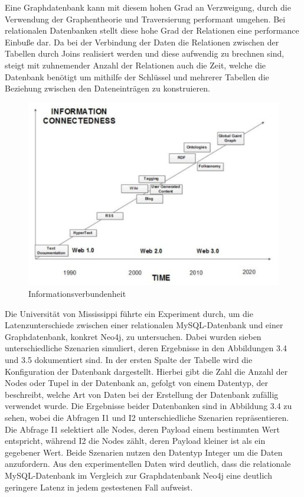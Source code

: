 \noindent
Eine Graphdatenbank kann mit diesem hohen Grad an Verzweigung, durch die Verwendung der Graphentheorie und Traversierung performant umgehen.  Bei relationalen Datenbanken stellt diese hohe Grad der Relationen eine performance Einbuße dar.  Da bei der Verbindung der Daten die Relationen zwischen der Tabellen durch Joins realisiert werden und diese aufwendig zu brechnen sind, steigt mit zuhnemender Anzahl der Relationen auch die Zeit, welche die Datenbank benötigt um mithilfe der Schlüssel und mehrerer Tabellen die Beziehung zwischen den Dateneinträgen zu konstruieren. \citep{9677042} \citep{graphdb}
\begin{figure}[H]
	\centering
	\includegraphics[scale=.45]{Illustrations/informationconnectedness.png}
	\caption{Informationsverbundenheit \citep{performancenosql}}
\end{figure}
\noindent
Die Universität von Mississippi führte ein Experiment durch, um die Latenzunterschiede zwischen einer relationalen MySQL-Datenbank und einer Graphdatenbank, konkret Neo4j, zu untersuchen. Dabei wurden sieben unterschiedliche Szenarien simuliert, deren Ergebnisse in den Abbildungen 3.4 und 3.5 dokumentiert sind. In der ersten Spalte der Tabelle wird die Konfiguration der Datenbank dargestellt. Hierbei gibt die Zahl die Anzahl der Nodes oder Tupel in der Datenbank an, gefolgt von einem Datentyp, der beschreibt, welche Art von Daten bei der Erstellung der Datenbank zufällig verwendet wurde.
Die Ergebnisse beider Datenbanken sind in Abbildung 3.4 zu sehen, wobei die Abfragen I1 und I2 unterschiedliche Szenarien repräsentieren. Die Abfrage I1 selektiert alle Nodes, deren Payload einem bestimmten Wert entspricht, während I2 die Nodes zählt, deren Payload kleiner ist als ein gegebener Wert. Beide Szenarien nutzen den Datentyp Integer um die Daten anzufordern. Aus den experimentellen Daten wird deutlich, dass die relationale MySQL-Datenbank im Vergleich zur Graphdatenbank Neo4j eine deutlich geringere Latenz in jedem gestestenen Fall aufweist.
